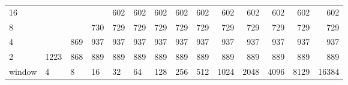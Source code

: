 \begin{table}[h]
{\begin{tabular}{l|rrrrrrrrrrrrr}
			\multicolumn{1}{|l|}{16} &  &  &  & \cellcolor[HTML]{E60000}602 & \cellcolor[HTML]{E60000}602 & \cellcolor[HTML]{E60000}602 & \cellcolor[HTML]{E60000}602 & \cellcolor[HTML]{E60000}602 & \cellcolor[HTML]{E60000}602 & \cellcolor[HTML]{E60000}602 & \cellcolor[HTML]{E60000}602 & \cellcolor[HTML]{E60000}602 & \cellcolor[HTML]{E60000}602 \\ \cline{1-1}
			\multicolumn{1}{|l|}{8} &  &  & \cellcolor[HTML]{E60000}730 & \cellcolor[HTML]{E60000}729 & \cellcolor[HTML]{E60000}729 & \cellcolor[HTML]{E60000}729 & \cellcolor[HTML]{E60000}729 & \cellcolor[HTML]{E60000}729 & \cellcolor[HTML]{E60000}729 & \cellcolor[HTML]{E60000}729 & \cellcolor[HTML]{E60000}729 & \cellcolor[HTML]{E60000}729 & \cellcolor[HTML]{E60000}729 \\ \cline{1-1}
			\multicolumn{1}{|l|}{4} &  & \cellcolor[HTML]{9900E6}869 & \cellcolor[HTML]{9900E6}937 & \cellcolor[HTML]{9900E6}937 & \cellcolor[HTML]{9900E6}937 & \cellcolor[HTML]{9900E6}937 & \cellcolor[HTML]{9900E6}937 & \cellcolor[HTML]{9900E6}937 & \cellcolor[HTML]{9900E6}937 & \cellcolor[HTML]{9900E6}937 & \cellcolor[HTML]{9900E6}937 & \cellcolor[HTML]{9900E6}937 & \cellcolor[HTML]{9900E6}937 \\ \cline{1-1}
			\multicolumn{1}{|l|}{2} & \cellcolor[HTML]{4C00E6}1223 & \cellcolor[HTML]{9900E6}868 & \cellcolor[HTML]{9900E6}889 & \cellcolor[HTML]{9900E6}889 & \cellcolor[HTML]{9900E6}889 & \cellcolor[HTML]{9900E6}889 & \cellcolor[HTML]{9900E6}889 & \cellcolor[HTML]{9900E6}889 & \cellcolor[HTML]{9900E6}889 & \cellcolor[HTML]{9900E6}889 & \cellcolor[HTML]{9900E6}889 & \cellcolor[HTML]{9900E6}889 & \cellcolor[HTML]{9900E6}889 \\ \hline
			window & \multicolumn{1}{l|}{4} & \multicolumn{1}{l|}{8} & \multicolumn{1}{l|}{16} & \multicolumn{1}{l|}{32} & \multicolumn{1}{l|}{64} & \multicolumn{1}{l|}{128} & \multicolumn{1}{l|}{256} & \multicolumn{1}{l|}{512} & \multicolumn{1}{l|}{1024} & \multicolumn{1}{l|}{2048} & \multicolumn{1}{l|}{4096} & \multicolumn{1}{l|}{8129} & \multicolumn{1}{l|}{16384} \\ \cline{2-14} 
		\end{tabular}
	}
\end{table}


